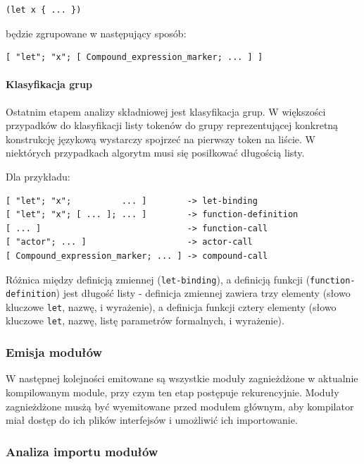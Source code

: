 \documentclass[11pt,oneside,a4paper,titlepage,onecolumn]{article}
\begin{document}
\begin{lstlisting}
(let x { ... })
\end{lstlisting}

będzie zgrupowane w następujący sposób:

\begin{lstlisting}
[ "let"; "x"; [ Compound_expression_marker; ... ] ]
\end{lstlisting}

\paragraph{Klasyfikacja grup}

Ostatnim etapem analizy składniowej jest klasyfikacja grup. W większości przypadków do klasyfikacji listy
tokenów do grupy reprezentującej konkretną konstrukcję językową wystarczy spojrzeć na pierwszy token na
liście. W niektórych przypadkach algorytm musi się posiłkować długością listy.

Dla przykładu:

\begin{lstlisting}
[ "let"; "x";          ... ]        -> let-binding
[ "let"; "x"; [ ... ]; ... ]        -> function-definition
[ ... ]                             -> function-call
[ "actor"; ... ]                    -> actor-call
[ Compound_expression_marker; ... ] -> compound-call
\end{lstlisting}

Różnica między definicją zmiennej (\texttt{let-binding}), a definicją funkcji (\texttt{function-definition})
jest długość listy - definicja zmiennej zawiera trzy elementy (słowo kluczowe \texttt{let}, nazwę, i
wyrażenie), a definicja funkcji cztery elementy (słowo kluczowe \texttt{let}, nazwę, listę parametrów
formalnych, i wyrażenie).

\subsubsection{Emisja modułów}

W następnej kolejności emitowane są wszystkie moduły zagnieżdżone w aktualnie kompilowanym module, przy czym
ten etap postępuje rekurencyjnie. Moduły zagnieżdżone musżą być wyemitowane przed modułem głównym, aby
kompilator miał dostęp do ich plików interfejsów i umożliwić ich importowanie.

\subsubsection{Analiza importu modułów}
\end{document}
